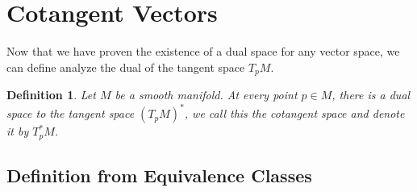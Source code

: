 \documentclass[a4paper]{article}
\newtheorem*{defn}{Definition}
\begin{document}
\section*{Cotangent Vectors}%
Now that we have proven the existence of a dual space for any vector space, we can define analyze the dual of the tangent space $T_pM$.

\begin{defn}
  Let $M$ be a smooth manifold. At every point $p \in M$, there is a dual space to the tangent space $(T_pM)^*$, we call this the cotangent space and denote it by $T_p^*M$.
\end{defn}

\subsection*{Definition from Equivalence Classes}%
\end{document}
